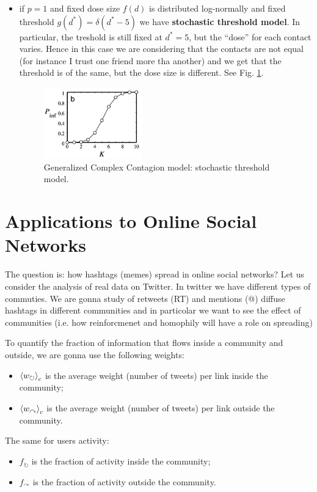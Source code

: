 \documentclass[../main/main.tex]{subfiles}
\begin{document}
\begin{itemize}
\item if \( p=1 \)  and fixed dose size $f(d)$ is distributed log-normally and fixed threshold $g(d^*) = \delta(d^*-5)$ we have \textbf{stochastic threshold model}. In particular, the treshold is still fixed at \( d^*=5 \), but the “dose” for each contact varies.
Hence in this case we are considering that the contacts are not equal (for instance I trust one friend more tha another) and we get that the threshold is of the same, but the dose size is different. See Fig. \ref{fig:11_3}.

\begin{figure}[h!]
\centering
\includegraphics[width=0.4\textwidth]{../lessons/image/11/3.png}
\caption{\label{fig:11_3} Generalized Complex Contagion model: stochastic threshold model.}
\end{figure}

\end{itemize}






\section{Applications to Online Social Networks}

The question is: how hashtags (memes) spread in online social networks?
Let us consider the analysis of real data on Twitter.
In twitter we have different types of commuties. We are gonna study of retweets (RT) and mentions (@) diffuse hashtags in different communities and in particolar we want to see the effect of communities (i.e. how reinforcmenet and homophily will have a role on spreading)

To quantify the fraction of information that flows inside a community and outside, we are gonna use the following weights:
\begin{itemize}
\item \( \expval{w_\circlearrowright}_c  \) is the average weight (number of tweets) per link inside the community;

\item \( \expval{w_\curvearrowright}_c  \) is the average weight (number of tweets) per link outside the community.
\end{itemize}
The same for users activity:
\begin{itemize}
\item \( f_\circlearrowright \) is the fraction of activity inside the community;

\item \( f_\curvearrowright  \) is the fraction of activity outside the community.
\end{itemize}
\end{document}
